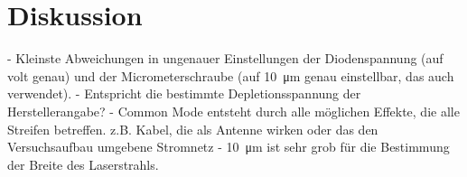 \section{Diskussion}
\label{sec:Diskussion}

- Kleinste Abweichungen in ungenauer Einstellungen der Diodenspannung (auf volt genau)
und der Micrometerschraube (auf \SI{10}{\micro\meter} genau einstellbar, das auch
verwendet).
- Entspricht die bestimmte Depletionsspannung der Herstellerangabe?
- Common Mode entsteht durch alle möglichen Effekte, die alle Streifen betreffen.
z.B. Kabel, die als Antenne wirken oder das den Versuchsaufbau umgebene Stromnetz
- \SI{10}{\micro\meter} ist sehr grob für die Bestimmung der Breite des Laserstrahls.
